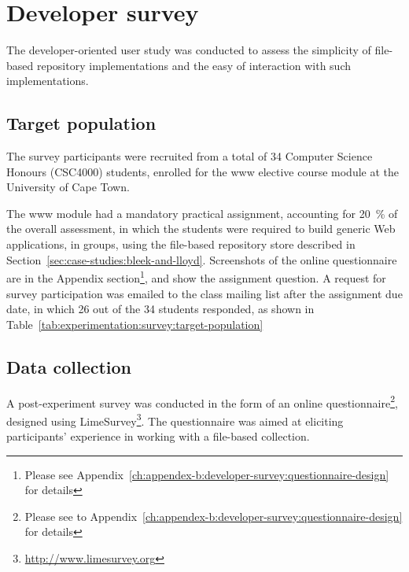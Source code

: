 \section[Developer survey]{Developer survey}
\label{sec:evaluation:developer-survey}


The developer-oriented user study was conducted to assess the simplicity of file-based repository implementations and the easy of interaction with such implementations.

\subsection{Target population}
\label{sec:evaluation:developer-survey:target-population}

The survey participants were recruited from a total of \num{34} Computer Science Honours (CSC4000) students, enrolled for the \gls{www} elective course module at the University of Cape Town.

The \gls{www} module had a mandatory practical assignment, accounting for \SI{20}{\percent} of the overall assessment, in which the students were required to build generic Web applications, in groups, using the file-based repository store described in Section~\ref{sec:case-studies:bleek-and-lloyd}. Screenshots of the online questionnaire are in the Appendix section\footnote{Please see Appendix~\ref{ch:appendex-b:developer-survey:questionnaire-design} for details}, and show the assignment question. A request for survey participation was emailed to the class mailing list after the assignment due date, in which \num{26} out of the \num{34} students responded, as shown in Table~\ref{tab:experimentation:survey:target-population}

\tablespacing

\bodyspacing

\subsection{Data collection}
\label{sec:evaluation:developer-survey:data-collection}

A post-experiment survey was conducted in the form of an online questionnaire\footnote{Please see to Appendix~\ref{ch:appendex-b:developer-survey:questionnaire-design} for details}, designed using LimeSurvey\footnote{\url{http://www.limesurvey.org}}. The questionnaire was aimed at eliciting participants' experience in working with a file-based collection.

